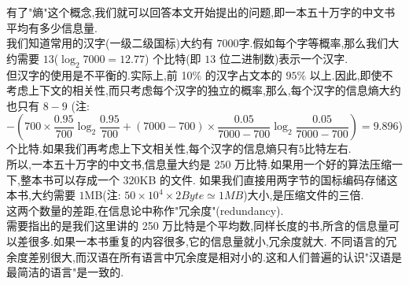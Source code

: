 \documentclass{article}
\begin{document}
有了"熵"这个概念,我们就可以回答本文开始提出的问题,即一本五十万字的中文书平均有多少信息量.\\
我们知道常用的汉字(一级二级国标)大约有 $7000 $字.假如每个字等概率,那么我们大约需要 $13$($\log_2{7000} = 12.77$) 个比特(即 $13$ 位二进制数)表示一个汉字.\\
但汉字的使用是不平衡的.实际上,前 1$0\%$ 的汉字占文本的 $95\%$ 以上.因此,即使不考虑上下文的相关性,而只考虑每个汉字的独立的概率,那么,每个汉字的信息熵大约也只有 $8-9$
(注: $ -(700 \times \dfrac{0.95}{700} \log_2{\dfrac{0.95}{700}} + (7000-700) \times \dfrac{0.05}{7000-700} \log_2{\dfrac{0.05}{7000-700}}) = 9.896$)
个比特.如果我们再考虑上下文相关性,每个汉字的信息熵只有5比特左右.\\
所以,一本五十万字的中文书,信息量大约是 $250$ 万比特.如果用一个好的算法压缩一下,整本书可以存成一个 $320$KB 的文件.
如果我们直接用两字节的国标编码存储这本书,大约需要 $1$MB(注: $50 \times 10^4 \times 2 Byte \simeq 1MB$)大小,是压缩文件的三倍.\\
这两个数量的差距,在信息论中称作"冗余度"(redundancy). \\
需要指出的是我们这里讲的 250 万比特是个平均数,同样长度的书,所含的信息量可以差很多.如果一本书重复的内容很多,它的信息量就小,冗余度就大.
不同语言的冗余度差别很大,而汉语在所有语言中冗余度是相对小的.这和人们普遍的认识"汉语是最简洁的语言"是一致的.
\end{document}
